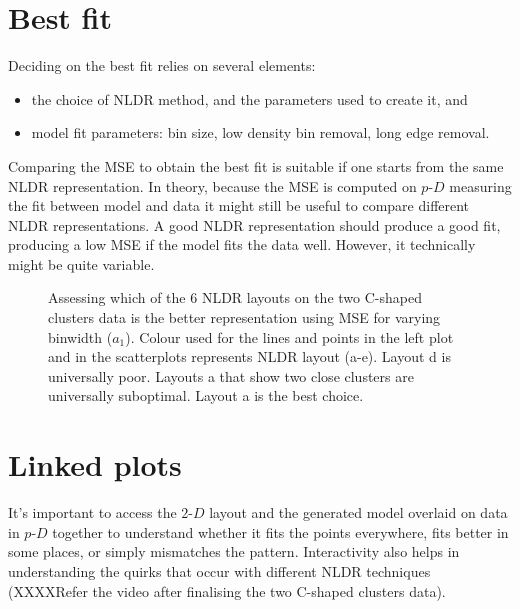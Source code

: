 \documentclass[
  12pt]{article}
\providecommand{\tightlist}{%
  \setlength{\itemsep}{0pt}\setlength{\parskip}{0pt}}\usepackage{longtable,booktabs,array}
\def\tightlist{}
\newcommand\pD{$p\text{-}D$}
\newcommand\gD{$2\text{-}D$}
\begin{document}
\section{Best fit}\label{best-fit}

Deciding on the best fit relies on several elements:

\begin{itemize}
\tightlist
\item
  the choice of NLDR method, and the parameters used to create it, and
\item
  model fit parameters: bin size, low density bin removal, long edge
  removal.
\end{itemize}

Comparing the MSE to obtain the best fit is suitable if one starts from
the same NLDR representation. In theory, because the MSE is computed on
\pD{} measuring the fit between model and data it might still be useful
to compare different NLDR representations. A good NLDR representation
should produce a good fit, producing a low MSE if the model fits the
data well. However, it technically might be quite variable.

\begin{figure}[H]


\caption{\label{fig-two_non_linear_diff_shaped_close_clusters-mse}Assessing
which of the 6 NLDR layouts on the two C-shaped clusters data is the
better representation using MSE for varying binwidth (\(a_1\)). Colour
used for the lines and points in the left plot and in the scatterplots
represents NLDR layout (a-e). Layout d is universally poor. Layouts a
that show two close clusters are universally suboptimal. Layout a is the
best choice.}

\end{figure}%

\section{Linked plots}\label{linked-plots}

It's important to access the \gD{} layout and the generated model
overlaid on data in \pD{} together to understand whether it fits the
points everywhere, fits better in some places, or simply mismatches the
pattern. Interactivity also helps in understanding the quirks that occur
with different NLDR techniques (XXXXRefer the video after finalising the
two C-shaped clusters data).
\end{document}
